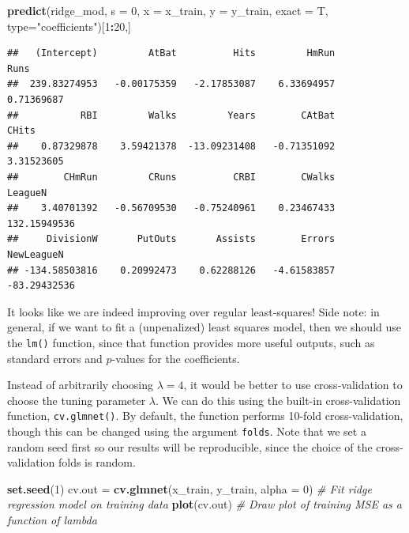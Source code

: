 \documentclass[openany]{book}
\newenvironment{Shaded}{\begin{snugshade}}{\end{snugshade}}
\newcommand{\CommentTok}[1]{\textcolor[rgb]{0.56,0.35,0.01}{\textit{#1}}}
\newcommand{\DataTypeTok}[1]{\textcolor[rgb]{0.13,0.29,0.53}{#1}}
\newcommand{\DecValTok}[1]{\textcolor[rgb]{0.00,0.00,0.81}{#1}}
\newcommand{\KeywordTok}[1]{\textcolor[rgb]{0.13,0.29,0.53}{\textbf{#1}}}
\newcommand{\NormalTok}[1]{#1}
\newcommand{\OperatorTok}[1]{\textcolor[rgb]{0.81,0.36,0.00}{\textbf{#1}}}
\newcommand{\StringTok}[1]{\textcolor[rgb]{0.31,0.60,0.02}{#1}}
\begin{document}
\begin{Shaded}
\begin{Highlighting}[]
\KeywordTok{predict}\NormalTok{(ridge_mod, }\DataTypeTok{s =} \DecValTok{0}\NormalTok{, }\DataTypeTok{x =}\NormalTok{ x_train, }\DataTypeTok{y =}\NormalTok{ y_train, }\DataTypeTok{exact =}\NormalTok{ T, }\DataTypeTok{type=}\StringTok{"coefficients"}\NormalTok{)[}\DecValTok{1}\OperatorTok{:}\DecValTok{20}\NormalTok{,]}
\end{Highlighting}
\end{Shaded}

\begin{verbatim}
##   (Intercept)         AtBat          Hits         HmRun          Runs 
##  239.83274953   -0.00175359   -2.17853087    6.33694957    0.71369687 
##           RBI         Walks         Years        CAtBat         CHits 
##    0.87329878    3.59421378  -13.09231408   -0.71351092    3.31523605 
##        CHmRun         CRuns          CRBI        CWalks       LeagueN 
##    3.40701392   -0.56709530   -0.75240961    0.23467433  132.15949536 
##     DivisionW       PutOuts       Assists        Errors    NewLeagueN 
## -134.58503816    0.20992473    0.62288126   -4.61583857  -83.29432536
\end{verbatim}

It looks like we are indeed improving over regular least-squares! Side note: in general, if we want to fit a (unpenalized) least squares model, then
we should use the \texttt{lm()} function, since that function provides more useful
outputs, such as standard errors and \(p\)-values for the coefficients.

Instead of arbitrarily choosing \(\lambda = 4\), it would be better to
use cross-validation to choose the tuning parameter \(\lambda\). We can do this using
the built-in cross-validation function, \texttt{cv.glmnet()}. By default, the function
performs 10-fold cross-validation, though this can be changed using the
argument \texttt{folds}. Note that we set a random seed first so our results will be
reproducible, since the choice of the cross-validation folds is random.

\begin{Shaded}
\begin{Highlighting}[]
\KeywordTok{set.seed}\NormalTok{(}\DecValTok{1}\NormalTok{)}
\NormalTok{cv.out =}\StringTok{ }\KeywordTok{cv.glmnet}\NormalTok{(x_train, y_train, }\DataTypeTok{alpha =} \DecValTok{0}\NormalTok{) }\CommentTok{# Fit ridge regression model on training data}
\KeywordTok{plot}\NormalTok{(cv.out) }\CommentTok{# Draw plot of training MSE as a function of lambda}
\end{Highlighting}
\end{Shaded}
\end{document}
